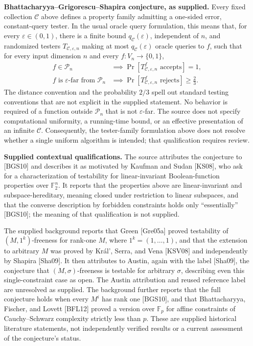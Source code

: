 \documentclass[11pt]{article}
\begin{document}
\textbf{Bhattacharyya--Grigorescu--Shapira conjecture, as supplied.} Every fixed collection \(\mathcal C\) above defines a property family admitting a one-sided error, constant-query tester. In the usual oracle query formulation, this means that, for every \(\varepsilon\in(0,1)\), there is a finite bound \(q_{\mathcal C}(\varepsilon)\), independent of \(n\), and randomized testers \(T_{\mathcal C,\varepsilon,n}\) making at most \(q_{\mathcal C}(\varepsilon)\) oracle queries to \(f\), such that for every input dimension \(n\) and every \(f\colon V_n\to\{0,1\}\),
\[
\begin{aligned}
f\in\mathcal P_n&\implies\Pr[T_{\mathcal C,\varepsilon,n}^{f}\text{ accepts}]=1,\\
f\text{ is }\varepsilon\text{-far from }\mathcal P_n&\implies\Pr[T_{\mathcal C,\varepsilon,n}^{f}\text{ rejects}]\ge\tfrac23.
\end{aligned}
\]
The distance convention and the probability \(2/3\) spell out standard testing conventions that are not explicit in the supplied statement. No behavior is required of a function outside \(\mathcal P_n\) that is not \(\varepsilon\)-far. The source does not specify computational uniformity, a running-time bound, or an effective presentation of an infinite \(\mathcal C\). Consequently, the tester-family formulation above does not resolve whether a single uniform algorithm is intended; that qualification requires review.

\textbf{Supplied contextual qualifications.} The source attributes the conjecture to [BGS10] and describes it as motivated by Kaufman and Sudan [KS08], who ask for a characterization of testability for linear-invariant Boolean-function properties over \(\mathbb F_2^n\). It reports that the properties above are linear-invariant and subspace-hereditary, meaning closed under restriction to linear subspaces, and that the converse description by forbidden constraints holds only ``essentially'' [BGS10]; the meaning of that qualification is not supplied.

The supplied background reports that Green [Gre05a] proved testability of \((M,1^k)\)-freeness for rank-one \(M\), where \(1^k=(1,\ldots,1)\), and that the extension to arbitrary \(M\) was proved by Kr\'{a}l', Serra, and Vena [KSV08] and independently by Shapira [Sha09]. It then attributes to Austin, again with the label [Sha09], the conjecture that \((M,\sigma)\)-freeness is testable for arbitrary \(\sigma\), describing even this single-constraint case as open. The Austin attribution and reused reference label are unresolved as supplied. The background further reports that the full conjecture holds when every \(M^i\) has rank one [BGS10], and that Bhattacharyya, Fischer, and Lovett [BFL12] proved a version over \(\mathbb F_p\) for affine constraints of Cauchy--Schwarz complexity strictly less than \(p\). These are supplied historical literature statements, not independently verified results or a current assessment of the conjecture's status.
\end{document}
